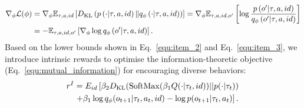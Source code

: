 \begin{equation}
\begin{aligned} 
\nabla_{\phi} \mathcal{L}(\phi)&=\nabla_{\phi} \mathbb{E}_{\tau, a, id}\left[D_{\mathrm{KL}}\left( p\left(\cdot | \tau, a, id\right) \| q_{\phi}\left(\cdot | \tau, a, id \right)\right)\right] =\nabla_{\phi} \mathbb{E}_{\tau, a, id, o^{\prime}}\left[\log \frac{p\left(o^{\prime} | \tau, a, id\right)}{q_{\phi}\left(o^{\prime} | \tau, a, id\right)}\right] 
\\ &=-\mathbb{E}_{\tau, a, id, o^{\prime}}\left[\nabla_{\phi} \log q_{\phi}\left(o^{\prime} | \tau, a, id\right)\right].
\end{aligned}
\end{equation}
Based on the lower bounds shown in Eq.~\ref{equ:item_2} and Eq.~\ref{equ:item_3}, we introduce intrinsic rewards to optimise the information-theoretic objective (Eq.~\ref{equ:mutual_information}) for encouraging diverse behaviors:
\begin{equation}
\begin{aligned} 
r^I &=  E_{id}\left[\beta_2 D_{\mathrm{KL}}({\rm SoftMax}(\beta_1 Q(\cdot | \tau_t, id)) || p(\cdot| \tau_t)) \right.
\\& \left.+ \beta_1 \log q_{\phi}(o_{t+1}| \tau_t,a_t,id) - \log p(o_{t+1}| \tau_t,a_t)\right].
\end{aligned}
\label{final reward}
\end{equation}
